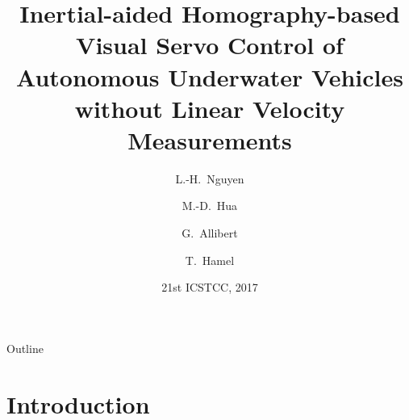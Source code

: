 \documentclass{beamer}
\title[AUV control without linear velocity measurements] %
{Inertial-aided Homography-based Visual Servo Control of Autonomous Underwater Vehicles without Linear Velocity Measurements}
\author[Nguyen, Hua, Allibert and Hamel] %
{L.-H.~Nguyen \and M.-D.~Hua \and G.~Allibert \and T.~Hamel}
\institute[Universities of Somewhere and Elsewhere] %
{
	\textit{Universit\'e C\^ote d'Azur, CNRS, I3S}\\
	Sophia Antipolis, France \\
	lhnguyen(hua,allibert,thamel)@i3s.unice.fr}
\date[ICSTCC 2017] %
{21st ICSTCC, 2017}
\begin{document}
\begin{frame}
  \titlepage
\end{frame}

\begin{frame}{Outline}
  \tableofcontents
\end{frame}





\section{Introduction}

\end{document}
